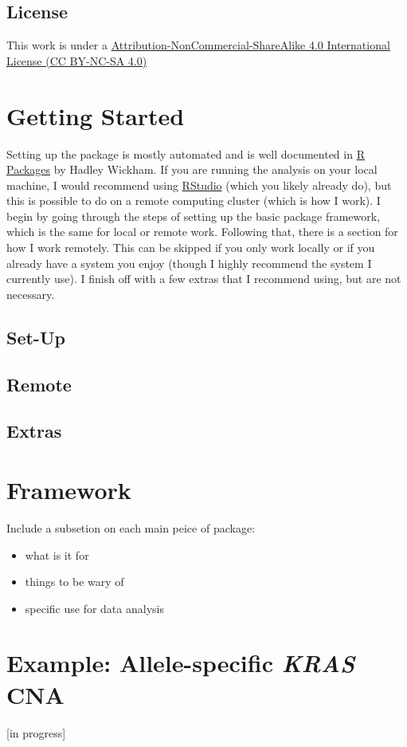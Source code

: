 \documentclass[]{book}
\providecommand{\tightlist}{%
  \setlength{\itemsep}{0pt}\setlength{\parskip}{0pt}}
\begin{document}
\section{License}\label{license}

This work is under a
\href{http://creativecommons.org/licenses/by-nc-sa/4.0/}{Attribution-NonCommercial-ShareAlike
4.0 International License (CC BY-NC-SA 4.0)}

\chapter{Getting Started}\label{getting-started}

Setting up the package is mostly automated and is well documented in
\href{http://r-pkgs.had.co.nz/intro.html}{R Packages} by Hadley Wickham.
If you are running the analysis on your local machine, I would recommend
using \href{https://www.rstudio.com}{RStudio} (which you likely already
do), but this is possible to do on a remote computing cluster (which is
how I work). I begin by going through the steps of setting up the basic
package framework, which is the same for local or remote work. Following
that, there is a section for how I work remotely. This can be skipped if
you only work locally or if you already have a system you enjoy (though
I highly recommend the system I currently use). I finish off with a few
extras that I recommend using, but are not necessary.

\section{Set-Up}\label{set-up}

\section{Remote}\label{remote}

\section{Extras}\label{extras}

\chapter{Framework}\label{framework}

Include a subsetion on each main peice of package:

\begin{itemize}
\tightlist
\item
  what is it for
\item
  things to be wary of
\item
  specific use for data analysis
\end{itemize}

\chapter{\texorpdfstring{Example: Allele-specific \emph{KRAS}
CNA}{Example: Allele-specific KRAS CNA}}\label{example-allele-specific-kras-cna}

{[}in progress{]}


\end{document}
